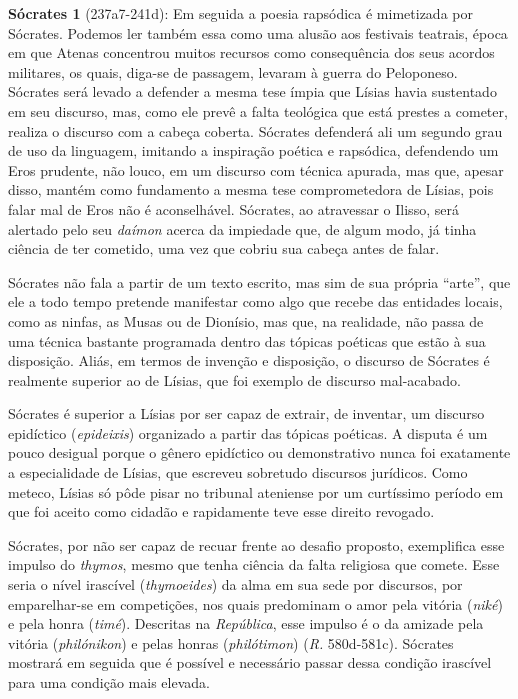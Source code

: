 \textbf{Sócrates 1} (237a7-241d): Em seguida a poesia rapsódica é
mimetizada por Sócrates. Podemos ler também essa como uma alusão aos
festivais teatrais, época em que Atenas concentrou muitos recursos como
consequência dos seus acordos militares, os quais, diga-se de passagem,
levaram à guerra do Peloponeso. Sócrates será levado a defender a mesma
tese ímpia que Lísias havia sustentado em seu discurso, mas, como ele
prevê a falta teológica que está prestes a cometer, realiza o discurso
com a cabeça coberta. Sócrates defenderá ali um segundo grau de uso da
linguagem, imitando a inspiração poética e rapsódica, defendendo um Eros
prudente, não louco, em um discurso com técnica apurada, mas que, apesar
disso, mantém como fundamento a mesma tese comprometedora de Lísias,
pois falar mal de Eros não é aconselhável. Sócrates, ao atravessar o
Ilisso, será alertado pelo seu \emph{daímon} acerca da impiedade que, de
algum modo, já tinha ciência de ter cometido, uma vez que cobriu sua
cabeça antes de falar.

Sócrates não fala a partir de um texto escrito, mas sim de sua própria
``arte'', que ele a todo tempo pretende manifestar como algo que recebe
das entidades locais, como as ninfas, as Musas ou de Dionísio, mas que,
na realidade, não passa de uma técnica bastante programada dentro das
tópicas poéticas que estão à sua disposição. Aliás, em termos de
invenção e disposição, o discurso de Sócrates é realmente superior ao de
Lísias, que foi exemplo de discurso mal-acabado.

Sócrates é superior a Lísias por ser capaz de extrair, de inventar, um
discurso epidíctico (\emph{epideixis}) organizado a partir das tópicas
poéticas. A disputa é um pouco desigual porque o gênero epidíctico ou
demonstrativo nunca foi exatamente a especialidade de Lísias, que
escreveu sobretudo discursos jurídicos. Como meteco, Lísias só pôde
pisar no tribunal ateniense por um curtíssimo período em que foi aceito
como cidadão e rapidamente teve esse direito revogado.

Sócrates, por não ser capaz de recuar frente ao desafio proposto,
exemplifica esse impulso do \emph{thymos}, mesmo que tenha ciência da
falta religiosa que comete. Esse seria o nível irascível
(\emph{thymoeides}) da alma em sua sede por discursos, por emparelhar-se
em competições, nos quais predominam o amor pela vitória (\emph{niké}) e
pela honra (\emph{timé}). Descritas na \emph{República}, esse impulso é
o da amizade pela vitória (\emph{philónikon}) e pelas honras
(\emph{philótimon}) (\emph{R.} 580d-581c). Sócrates mostrará em seguida
que é possível e necessário passar dessa condição irascível para uma
condição mais elevada.

